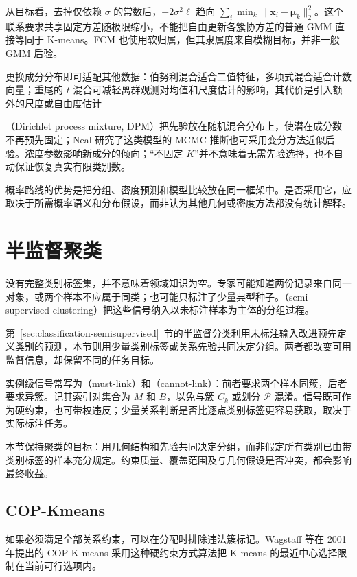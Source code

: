 从目标看，去掉仅依赖 $\sigma$ 的常数后，$-2\sigma^2\ell$ 趋向 $\sum_i\min_k\lVert\bm{x}_i-\bm{\mu}_k\rVert_2^2$。这个联系要求共享固定方差随极限缩小，不能把自由更新各簇协方差的普通 GMM 直接等同于 K-means。FCM 也使用软归属，但其隶属度来自模糊目标，并非一般 GMM 后验。

更换成分分布即可适配其他数据：伯努利混合适合二值特征，多项式混合适合计数向量；重尾的 $t$ 混合可减轻离群观测对均值和尺度估计的影响，其代价是引入额外的尺度或自由度估计

（Dirichlet process mixture, DPM）把先验放在随机混合分布上，使潜在成分数不再预先固定；Neal 研究了这类模型的 MCMC 推断也可采用变分方法近似后验。浓度参数影响新成分的倾向；“不固定 $K$”并不意味着无需先验选择，也不自动保证恢复真实有限类别数。

概率路线的优势是把分组、密度预测和模型比较放在同一框架中。是否采用它，应取决于所需概率语义和分布假设，而非认为其他几何或密度方法都没有统计解释。

\section{半监督聚类}
\label{sec:clustering-semisupervised}

没有完整类别标签集，并不意味着领域知识为空。专家可能知道两份记录来自同一对象，或两个样本不应属于同类；也可能只标注了少量典型种子。（semi-supervised clustering）把这些信号纳入以未标注样本为主体的分组过程。

第~\ref{sec:classification-semisupervised}~节的半监督分类利用未标注输入改进预先定义类别的预测，本节则用少量类别标签或关系先验共同决定分组。两者都改变可用监督信息，却保留不同的任务目标。

实例级信号常写为（must-link）和（cannot-link）：前者要求两个样本同簇，后者要求异簇。记其索引对集合为 $M$ 和 $B$，以免与簇 $C_k$ 或划分 $\mathcal{P}$ 混淆。信号既可作为硬约束，也可带权违反；少量关系判断是否比逐点类别标签更容易获取，取决于实际标注任务。

本节保持聚类的目标：用几何结构和先验共同决定分组，而非假定所有类别已由带类别标签的样本充分规定。约束质量、覆盖范围及与几何假设是否冲突，都会影响最终收益。

\subsection{COP-Kmeans}
\label{sec:clustering-cop}

如果必须满足全部关系约束，可以在分配时排除违法簇标记。Wagstaff 等在 2001 年提出的 COP-K-means 采用这种硬约束方式算法把 K-means 的最近中心选择限制在当前可行选项内。

